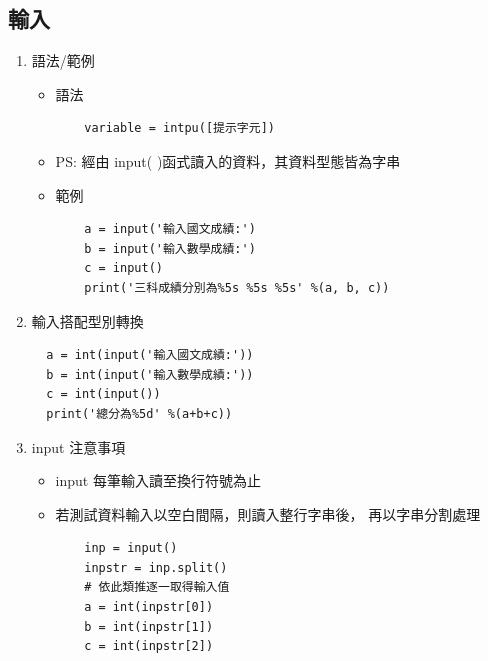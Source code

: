 \documentclass[a4paper,12pt]{article}
\begin{document}
\subsection{輸入}
\label{sec:org5aa6e06}
\begin{enumerate}
\item 語法/範例
\label{sec:orgb711e14}
\begin{itemize}
\item 語法\\
\lstset{breaklines=true,language=Python,label= ,caption= ,captionpos=b,firstnumber=1,numbers=left}
\begin{lstlisting}
    variable = intpu([提示字元])
\end{lstlisting}
\item PS: 經由 input( )函式讀入的資料，其資料型態皆為字串\\

\item 範例\\
\lstset{breaklines=true,language=Python,label= ,caption= ,captionpos=b,firstnumber=1,numbers=left}
\begin{lstlisting}
    a = input('輸入國文成績:')
    b = input('輸入數學成績:')
    c = input()
    print('三科成績分別為%5s %5s %5s' %(a, b, c))
\end{lstlisting}
\end{itemize}

\item 輸入搭配型別轉換
\label{sec:orgc21d36f}
\lstset{breaklines=true,language=Python,label= ,caption= ,captionpos=b,firstnumber=1,numbers=left}
\begin{lstlisting}
  a = int(input('輸入國文成績:'))
  b = int(input('輸入數學成績:'))
  c = int(input())
  print('總分為%5d' %(a+b+c))
\end{lstlisting}

\item input 注意事項
\label{sec:org2aa45e0}
\begin{itemize}
\item input 每筆輸入讀至換行符號為止\\
\item 若測試資料輸入以空白間隔，則讀入整行字串後， 再以字串分割處理\\
\lstset{breaklines=true,language=Python,label= ,caption= ,captionpos=b,firstnumber=1,numbers=left}
\begin{lstlisting}
    inp = input()
    inpstr = inp.split()
    # 依此類推逐一取得輸入值
    a = int(inpstr[0])
    b = int(inpstr[1])
    c = int(inpstr[2])
\end{lstlisting}
\end{itemize}
\end{enumerate}
\end{document}
